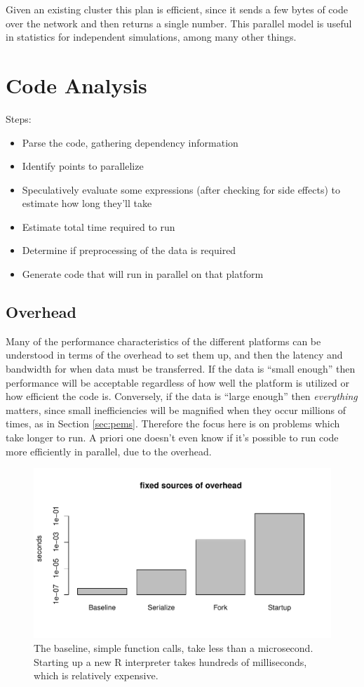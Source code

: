 \documentclass[12pt]{article}
\begin{document}
Given an existing cluster this plan is efficient, since it
sends a few bytes of code over the network and then returns a single
number. This parallel model is useful in statistics for independent
simulations, among many other things.

\section{Code Analysis}

Steps:

\begin{itemize}
    \item Parse the code, gathering dependency information
    \item Identify points to parallelize
    \item Speculatively evaluate some expressions (after checking for side
        effects) to estimate how long they'll
        take
    \item Estimate total time required to run
    \item Determine if preprocessing of the data is required
    \item Generate code that will run in parallel on that platform
\end{itemize}

\subsection{Overhead}

Many of the performance characteristics of the different platforms can be
understood in terms of the overhead to set them up, and then the latency
and bandwidth for when data must be transferred.  If the data is ``small
enough'' then performance will be acceptable regardless of how well the
platform is utilized or how efficient the code is. Conversely, if the data
is ``large enough'' then \emph{everything} matters, since small
inefficiencies will be magnified when they occur millions of times, as in
Section \ref{sec:pems}.  Therefore the focus here is on problems which take longer
to run. A priori one doesn't even know if it's possible to run code more
efficiently in parallel, due to the overhead.

\begin{figure}
\centering
\includegraphics[width=.8\linewidth]{compute_times/overhead}
\caption{The baseline, simple function calls, take less than a microsecond. Starting up a
    new R interpreter takes hundreds of milliseconds, which is relatively expensive.}
\label{fig:overhead}
\end{figure}
\end{document}
